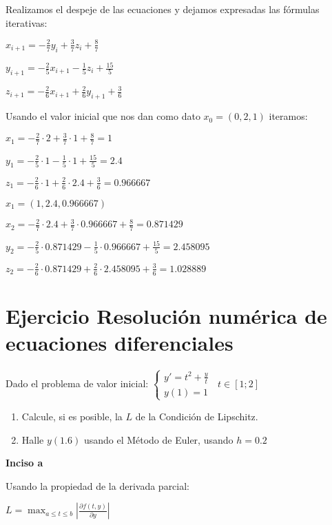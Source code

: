 \documentclass[11pt]{article}
\begin{document}
	Realizamos el despeje de las ecuaciones y dejamos expresadas las fórmulas iterativas:

	$\displaystyle x_{i+1}=-\frac{2}{7}y_i+\frac{3}{7}z_i+\frac{8}{7}$
	
	$\displaystyle y_{i+1}=-\frac{2}{5}x_{i+1}-\frac{1}{5}z_i+\frac{15}{5}$
	
	$\displaystyle z_{i+1}=-\frac{2}{6}x_{i+1}+\frac{2}{6}y_{i+1}+\frac{3}{6}$
	
	Usando el valor inicial que nos dan como dato $x_0=(0,2,1)$ iteramos:
	
	$\displaystyle x_1=-\frac{2}{7}\cdot2+\frac{3}{7}\cdot 1+\frac{8}{7}=1$
	
	$\displaystyle y_1=-\frac{2}{5}\cdot1-\frac{1}{5}\cdot 1+\frac{15}{5}=2.4$
	
	$\displaystyle z_1=-\frac{2}{6}\cdot1+\frac{2}{6}\cdot 2.4+\frac{3}{6}=0.966667$
	
	$\boxed{x_1=(1,2.4,0.966667)}$
	
	$\displaystyle x_2=-\frac{2}{7}\cdot2.4+\frac{3}{7}\cdot 0.966667+\frac{8}{7}=0.871429$
	
	$\displaystyle y_2=-\frac{2}{5}\cdot0.871429-\frac{1}{5}\cdot 0.966667+\frac{15}{5}=2.458095$
	
	$\displaystyle z_2=-\frac{2}{6}\cdot0.871429+\frac{2}{6}\cdot 2.458095+\frac{3}{6}=1.028889$
	

	
	\section{Ejercicio Resolución numérica de ecuaciones diferenciales}
	Dado el problema de valor inicial:
	$\begin{cases}
		y'=t^2+\frac{y}{t}\\
		y(1)=1
	\end{cases}\;\; t \in [1;2]$
	
	\begin{enumerate}[label=\alph*)]
		\item Calcule, si es posible, la $L$ de la Condición de Lipschitz.
		\item Halle $y(1.6)$ usando el Método de Euler, usando $h=0.2$
	\end{enumerate}

	\textbf{Inciso a}
	
	Usando la propiedad de la derivada parcial:
	
	$\displaystyle L=\max_{a\le t \le b} \left|\frac{\partial f(t,y)}{\partial y}\right|$
	
\end{document}
